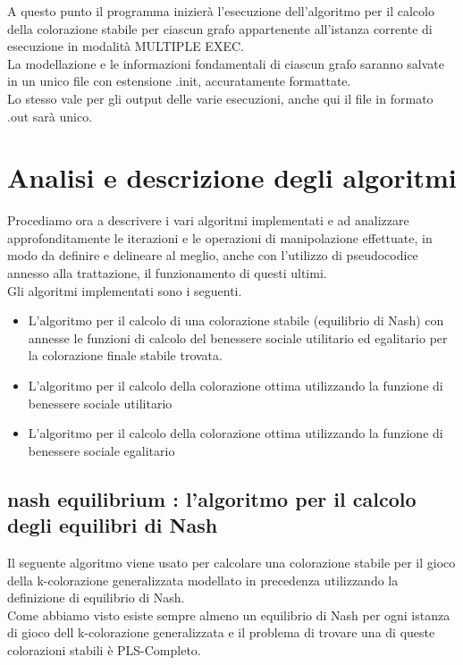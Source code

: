 A questo punto il programma inizierà l'esecuzione dell'algoritmo per il calcolo della colorazione stabile per ciascun grafo appartenente all'istanza corrente di esecuzione in modalità MULTIPLE EXEC.\\
La modellazione e le informazioni fondamentali di ciascun grafo saranno salvate in un unico file con estensione .init, accuratamente formattate.\\
Lo stesso vale per gli output delle varie esecuzioni, anche qui il file in formato .out sarà unico.\\

\section{Analisi e descrizione degli algoritmi}
\justify

Procediamo ora a descrivere i vari algoritmi implementati e ad analizzare approfonditamente le iterazioni e le operazioni di manipolazione effettuate, in modo da definire e delineare al meglio, anche con l'utilizzo di pseudocodice annesso alla trattazione, il funzionamento di questi ultimi.\\

Gli algoritmi implementati sono i seguenti.

\begin{itemize}
	\item L'algoritmo per il calcolo di una colorazione stabile (equilibrio di Nash) con annesse le funzioni di calcolo del benessere sociale utilitario ed egalitario per la colorazione finale stabile trovata.
	\item L'algoritmo per il calcolo della colorazione ottima utilizzando la funzione di benessere sociale utilitario 
	\item L'algoritmo per il calcolo della colorazione ottima utilizzando la funzione di benessere sociale egalitario 
\end{itemize}

\subsection{nash equilibrium : l'algoritmo per il calcolo degli equilibri di Nash}
\justify
Il seguente algoritmo viene usato per calcolare una colorazione stabile per il gioco della k-colorazione generalizzata modellato in precedenza utilizzando la definizione di equilibrio di Nash.\\

Come abbiamo visto esiste sempre almeno un equilibrio di Nash per ogni istanza di gioco dell k-colorazione generalizzata e il problema di trovare una di queste colorazioni stabili è PLS-Completo.\\

